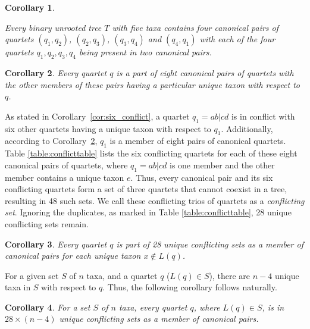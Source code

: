 \documentclass[10pt,a4paper]{article}
\newtheorem{corollary}{Corollary}[theorem]
\begin{document}
\begin{appendices}
\begin{corollary}
\label{cor:two-pair-quartets}
 
Every binary unrooted tree $T$ with five taxa contains four canonical pairs of quartets $(q_1,q_2)$, $(q_2,q_3)$, $(q_3,q_4)$ and $(q_4,q_1)$ with each of the four quartets $q_1, q_2, q_3, q_4$ being present in two canonical pairs. 
\end{corollary}

\begin{corollary}
\label{cor:eight-pairs}
Every quartet $q$ is a part of eight canonical pairs of quartets with the other members of these pairs having a particular unique taxon with respect to $q$. 
\end{corollary}


As stated in Corollary~\ref{cor:six_conflict}, a quartet $q_1 = ab|cd$ is in conflict with six other quartets having a unique taxon with respect to $q_1$. Additionally, according to Corollary~\ref{cor:eight-pairs}, $q_1$ is a member of eight pairs of canonical quartets. Table \ref{table:conflicttable} lists the six conflicting quartets for each of these eight canonical pairs of quartets, where $q_1=ab|cd$ is one member and the other member contains a unique taxon $e$. Thus, every canonical pair and its six conflicting quartets form a set of three quartets that cannot coexist in a tree, resulting in 48 such sets. We call these conflicting trios of quartets as a \textit{conflicting set}. Ignoring the duplicates, as marked in Table \ref{table:conflicttable}, 28 unique conflicting sets remain.



\begin{corollary}
\label{cor:unique-conflict}
Every quartet $q$ is part of 28 unique conflicting sets as a member of canonical pairs for each unique taxon $x \notin L(q) $.
\end{corollary}

For a given set $S$ of $n$ taxa, and a quartet $q$ ($L(q) \in S$), there are $n-4$ unique taxa in $S$ with respect to $q$. Thus, the following corollary follows naturally.

\begin{corollary}
\label{cor:total_unique_conflict}
For a set $S$ of $n$ taxa, every quartet $q$, where $L(q) \in S$, is in $28 \times (n-4)$ unique conflicting sets as a member of canonical pairs.
\end{corollary}

\clearpage


\end{appendices}
\end{document}

